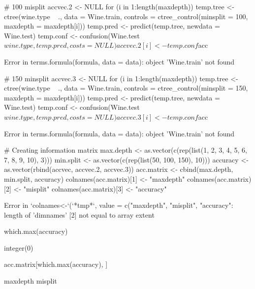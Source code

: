 \documentclass[letterpaper]{article}\usepackage[]{graphicx}\usepackage[]{color}
\begin{document}
\begin{Schunk}
\begin{Soutput}
\end{Soutput}
\begin{Sinput}
# 100 misplit
accvec.2 <- NULL
for (i in 1:length(maxdepth)) {
    temp.tree <- ctree(wine.type ~ ., data = Wine.train, controls = ctree_control(minsplit = 100, 
        maxdepth = maxdepth[i]))
    temp.pred <- predict(temp.tree, newdata = Wine.test)
    temp.conf <- confusion(Wine.test$wine.type, temp.pred, costs = NULL)
    accvec.2[i] <- temp.conf$acc
}
\end{Sinput}
\begin{Soutput}
Error in terms.formula(formula, data = data): object 'Wine.train' not found
\end{Soutput}
\begin{Sinput}
# 150 minsplit
accvec.3 <- NULL
for (i in 1:length(maxdepth)) {
    temp.tree <- ctree(wine.type ~ ., data = Wine.train, controls = ctree_control(minsplit = 150, 
        maxdepth = maxdepth[i]))
    temp.pred <- predict(temp.tree, newdata = Wine.test)
    temp.conf <- confusion(Wine.test$wine.type, temp.pred, costs = NULL)
    accvec.3[i] <- temp.conf$acc
}
\end{Sinput}
\begin{Soutput}
Error in terms.formula(formula, data = data): object 'Wine.train' not found
\end{Soutput}
\begin{Sinput}
# Creating information matrix
max.depth <- as.vector(c(rep(list(1, 2, 3, 4, 5, 6, 7, 8, 9, 10), 3)))
min.split <- as.vector(c(rep(list(50, 100, 150), 10)))
accuracy <- as.vector(rbind(accvec, accvec.2, accvec.3))
acc.matrix <- cbind(max.depth, min.split, accuracy)
colnames(acc.matrix)[1] <- "maxdepth"
colnames(acc.matrix)[2] <- "misplit"
colnames(acc.matrix)[3] <- "accuracy"
\end{Sinput}
\begin{Soutput}
Error in `colnames<-`(`*tmp*`, value = c("maxdepth", "misplit", "accuracy": length of 'dimnames' [2] not equal to array extent
\end{Soutput}
\begin{Sinput}
which.max(accuracy)
\end{Sinput}
\begin{Soutput}
integer(0)
\end{Soutput}
\begin{Sinput}
acc.matrix[which.max(accuracy), ]
\end{Sinput}
\begin{Soutput}
     maxdepth misplit
\end{Soutput}

\end{Schunk}
\end{document}
